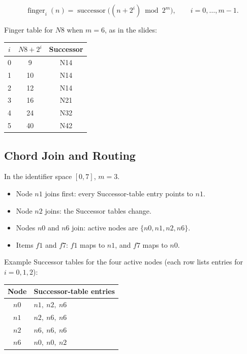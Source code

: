 \documentclass{article}
\begin{document}
\[
\operatorname{finger}_i(n)=\operatorname{successor}\bigl((n+2^i)\bmod 2^m\bigr),
\qquad i=0,\ldots,m-1.
\]

Finger table for \(N8\) when \(m=6\), as in the slides:

\begin{center}
\begin{tabular}{ccc}
\toprule
\(i\) & \(N8+2^i\) & Successor \\
\midrule
0 & 9  & N14 \\
1 & 10 & N14 \\
2 & 12 & N14 \\
3 & 16 & N21 \\
4 & 24 & N32 \\
5 & 40 & N42 \\
\bottomrule
\end{tabular}
\end{center}

\subsection{Chord Join and Routing}

In the identifier space \([0,7]\), \(m=3\).

\begin{itemize}
    \item Node \(n1\) joins first: every Successor-table entry points to \(n1\).
    \item Node \(n2\) joins: the Successor tables change.
    \item Nodes \(n0\) and \(n6\) join: active nodes are \(\{n0,n1,n2,n6\}\).
    \item Items \(f1\) and \(f7\): \(f1\) maps to \(n1\), and \(f7\) maps to \(n0\).
\end{itemize}

Example Successor tables for the four active nodes (each row lists entries for \(i=0,1,2\)):

\begin{center}
\begin{tabular}{cl}
\toprule
Node & Successor-table entries \\
\midrule
\(n0\) & \(n1,\ n2,\ n6\) \\
\(n1\) & \(n2,\ n6,\ n6\) \\
\(n2\) & \(n6,\ n6,\ n6\) \\
\(n6\) & \(n0,\ n0,\ n2\) \\
\bottomrule
\end{tabular}
\end{center}
\end{document}
